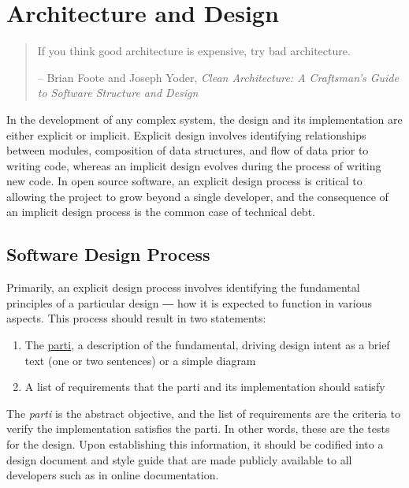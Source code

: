 \documentclass[]{nlr}
\begin{document}
\section{Architecture and Design}

\begin{quote}
    If you think good architecture is expensive, try bad architecture.

    -- Brian Foote and Joseph Yoder, \textit{Clean Architecture: A Craftsman's Guide to Software Structure and Design}
\end{quote}

In the development of any complex system, the design and its implementation are either
explicit or implicit.
Explicit design involves identifying relationships between modules, composition of data
structures, and flow of data prior to writing code, whereas an implicit design evolves during the
process of writing new code.
In open source software, an explicit design process is critical to allowing the project
to grow beyond a single developer, and the consequence of an implicit design process
is the common case of technical debt.

\subsection{Software Design Process}

Primarily, an explicit design process involves identifying the fundamental principles
of a particular design ― how it is expected to function in various aspects.
This process should result in two statements:

\begin{enumerate}
\item The \href{https://en.wikipedia.org/wiki/Parti_(architecture)}{parti}, a description of the
    fundamental, driving design intent as a brief text (one or two sentences) or a
    simple diagram
\item A list of requirements that the parti and its implementation should satisfy
\end{enumerate}

The \textit{parti} is the abstract objective, and the list of requirements are the criteria
to verify the implementation satisfies the parti.
In other words, these are the tests for the design.
Upon establishing this information, it should be codified into a design document and style
guide that are made publicly available to all developers such as in online documentation.
\end{document}
